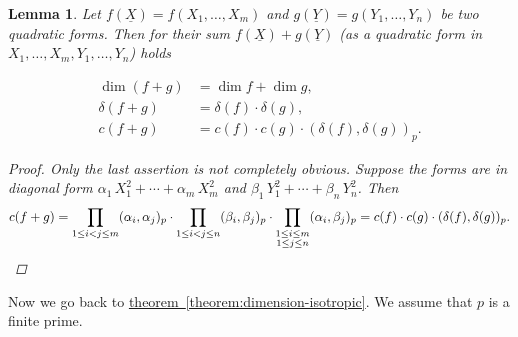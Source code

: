 \documentclass{article}
\newcommand{\refref}[2]{\hyperref[#2]{#1~\ref*{#2}}}
\theoremstyle{myplain}
\newtheorem{lemma}[proposition]{Lemma}
\theoremstyle{mydefinition}
\begin{document}
\begin{lemma}
  Let $f (\underline{X}) = f (X_1,\ldots,X_m)$ and
  $g (\underline{Y})= g (Y_1,\ldots,Y_n)$ be two quadratic forms. Then for their
  sum $f (\underline{X}) + g (\underline{Y})$ (as a quadratic form in
  $X_1,\ldots,X_m,Y_1,\ldots,Y_n$) holds

  \begin{align*}
    \dim (f + g) & = \dim f + \dim g,\\
    \delta (f + g) & = \delta (f) \cdot \delta (g),\\
    c (f + g) & = c(f) \cdot c(g) \cdot (\delta (f), \delta (g))_p.
  \end{align*}

  \begin{proof}
    Only the last assertion is not completely obvious. Suppose the forms are in
    diagonal form $\alpha_1\,X_1^2 + \cdots + \alpha_m\,X_m^2$ and
    $\beta_1\,Y_1^2 + \cdots + \beta_n\,Y_n^2$. Then
    \[ c (f + g) =
      \prod_{1 \le i < j \le m} (\alpha_i, \alpha_j)_p \cdot
      \prod_{1 \le i < j \le n} (\beta_i, \beta_j)_p \cdot
      \prod_{\substack{1 \le i \le m \\ 1 \le j \le n}} (\alpha_i, \beta_j)_p =
      c (f) \cdot c (g) \cdot (\delta (f), \delta (g))_p. \qedhere \]
  \end{proof}
\end{lemma}

Now we go back to \refref{theorem}{theorem:dimension-isotropic}. We assume that
$p$ is a finite prime.
\end{document}
